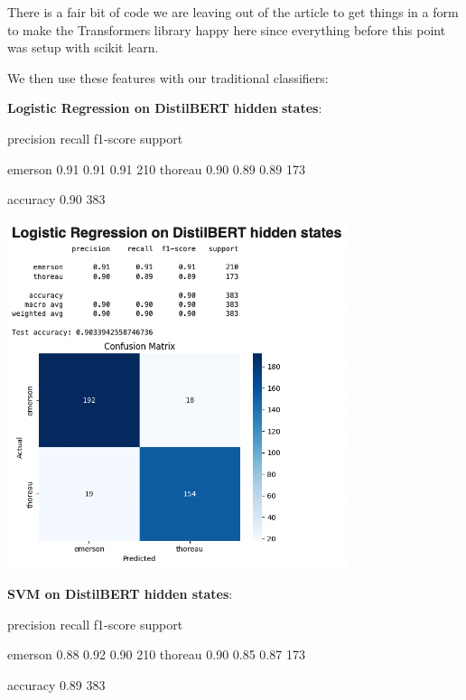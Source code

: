\documentclass[
]{article}
\newenvironment{Shaded}{}{}
\newcommand{\NormalTok}[1]{#1}
\begin{document}
There is a fair bit of code we are leaving out of the article to get
things in a form to make the Transformers library happy here since
everything before this point was setup with scikit learn.

We then use these features with our traditional classifiers:

\textbf{Logistic Regression on DistilBERT hidden states}:

\begin{Shaded}
\begin{Highlighting}[]
\NormalTok{precision    recall  f1{-}score   support}

\NormalTok{emerson       0.91      0.91      0.91       210}
\NormalTok{thoreau       0.90      0.89      0.89       173}

\NormalTok{accuracy                          0.90       383}
\end{Highlighting}
\end{Shaded}

\includegraphics[width=0.75\textwidth]{lr_dbert_confusion.png}

\textbf{SVM on DistilBERT hidden states}:

\begin{Shaded}
\begin{Highlighting}[]
\NormalTok{precision    recall  f1{-}score   support}

\NormalTok{emerson       0.88      0.92      0.90       210}
\NormalTok{thoreau       0.90      0.85      0.87       173}

\NormalTok{accuracy                          0.89       383}
\end{Highlighting}
\end{Shaded}
\end{document}
